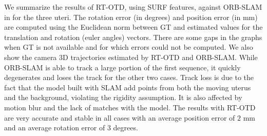 We summarize the results of RT-OTD, using SURF features, against ORB-SLAM in  for the three uteri. The rotation error (in degrees) and position error (in mm) are computed using the Euclidean norm between GT and estimated values for the translation and rotation (euler angles) vectors. There are some gaps in the graphs when GT is not available and for which errors could not be computed. We also show the camera 3D trajectories estimated by RT-OTD and ORB-SLAM. While ORB-SLAM is able to track a large portion of the first sequence, it quickly degenerates and loses the track for the other two cases. Track loss is due to the fact that the model built with SLAM add points from both the moving uterus and the background, violating the rigidity assumption. It is also affected by motion blur and the lack of matches with the model. The results with RT-OTD are very accurate  and stable in all cases with an average position error of $2$ mm and an average rotation error of $3$ degrees.   
